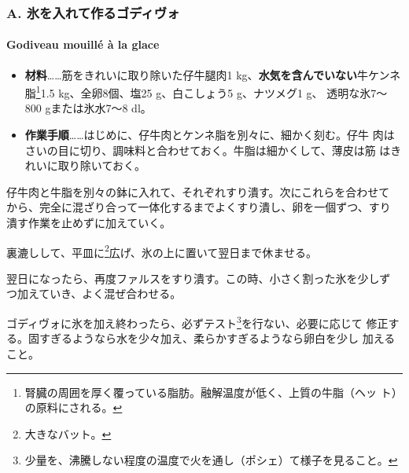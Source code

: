 \begin{recette}
\hypertarget{a.-ux6c37ux3092ux5165ux308cux3066ux4f5cux308bux30b4ux30c7ux30a3ux30f4ux30a9}{%
\subsubsection{A.
氷を入れて作るゴディヴォ}\label{a.-ux6c37ux3092ux5165ux308cux3066ux4f5cux308bux30b4ux30c7ux30a3ux30f4ux30a9}}

\hypertarget{godiveau-mouilluxe9-uxe0-la-glace}{%
\paragraph{Godiveau mouillé à la
glace}\label{godiveau-mouilluxe9-uxe0-la-glace}}


\begin{itemize}
\item
  \textbf{材料}\ldots{}\ldots{}筋をきれいに取り除いた仔牛腿肉1
  kg、\textbf{水気を含んでいない}牛ケンネ脂\footnote{腎臓の周囲を厚く覆っている脂肪。融解温度が低く、上質の牛脂（ヘッ
    ト）の原料にされる。}1.5 kg、全卵8個、塩25 g、白こしょう5
  g、ナツメグ1 g、 透明な氷7〜800 gまたは氷水7〜8 dl。
\item
  \textbf{作業手順}\ldots{}\ldots{}はじめに、仔牛肉とケンネ脂を別々に、細かく刻む。仔牛
  肉はさいの目に切り、調味料と合わせておく。牛脂は細かくして、薄皮は筋
  はきれいに取り除いておく。
\end{itemize}

仔牛肉と牛脂を別々の鉢に入れて、それぞれすり潰す。次にこれらを合わせて
から、完全に混ざり合って一体化するまでよくすり潰し、卵を一個ずつ、すり
潰す作業を止めずに加えていく。

裏漉しして、平皿に\footnote{大きなバット。}広げ、氷の上に置いて翌日まで休ませる。

翌日になったら、再度ファルスをすり潰す。この時、小さく割った氷を少しず
つ加えていき、よく混ぜ合わせる。

ゴディヴォに氷を加え終わったら、必ずテスト\footnote{少量を、沸騰しない程度の温度で火を通し（ポシェ）て様子を見ること。}を行ない、必要に応じて
修正する。固すぎるようなら水を少々加え、柔らかすぎるようなら卵白を少し
加えること。
\end{recette}